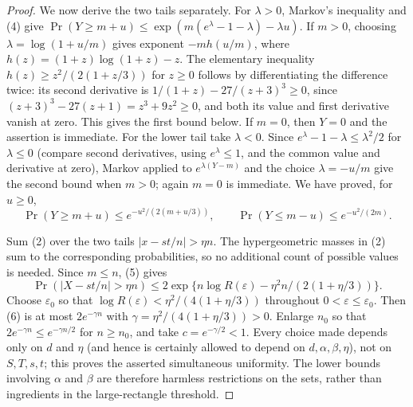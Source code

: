 \begin{proof}
We now derive the two tails separately.  For $\lambda>0$, Markov's inequality
and (4) give
$\Pr(Y\ge m+u)\le
\exp(m(e^\lambda-1-\lambda)-\lambda u)$.  If $m>0$, choosing
$\lambda=\log(1+u/m)$ gives exponent $-m h(u/m)$, where
$h(z)=(1+z)\log(1+z)-z$.  The elementary inequality
$h(z)\ge z^2/(2(1+z/3))$ for $z\ge0$ follows by differentiating the
difference twice: its second derivative is
$1/(1+z)-27/(z+3)^3\ge0$, since
$(z+3)^3-27(z+1)=z^3+9z^2\ge0$, and both its value and first derivative
vanish at zero.  This gives the first bound below.  If $m=0$, then $Y=0$ and the assertion
is immediate.  For the lower tail take $\lambda<0$.  Since
$e^\lambda-1-\lambda\le\lambda^2/2$ for $\lambda\le0$ (compare second
derivatives, using $e^\lambda\le1$, and the common value and derivative at
zero), Markov applied to
$e^{\lambda(Y-m)}$ and the choice $\lambda=-u/m$ give the second bound when
$m>0$; again $m=0$ is immediate.  We have proved, for $u\ge0$,
\[
 \Pr(Y\ge m+u)\le e^{-u^2/(2(m+u/3))},\qquad
 \Pr(Y\le m-u)\le e^{-u^2/(2m)}.                                 \tag{5}
\]

Sum (2) over the two tails $|x-st/n|>\eta n$.  The hypergeometric masses in
(2) sum to the corresponding probabilities, so no additional count of
possible values is needed.  Since $m\le n$, (5) gives
\[
 \Pr(|X-st/n|>\eta n)
 \le 2\exp\{n\log R(\varepsilon)-\eta^2n/(2(1+\eta/3))\}.         \tag{6}
\]
Choose $\varepsilon_0$ so that
$\log R(\varepsilon)<\eta^2/(4(1+\eta/3))$ throughout
$0<\varepsilon\le\varepsilon_0$.  Then (6) is at most
$2e^{-\gamma n}$ with $\gamma=\eta^2/(4(1+\eta/3))>0$.
Enlarge $n_0$ so that $2e^{-\gamma n}\le e^{-\gamma n/2}$ for
$n\ge n_0$, and take $c=e^{-\gamma/2}<1$.  Every choice made depends only on
$d$ and $\eta$ (and hence is certainly allowed to depend on
$d,\alpha,\beta,\eta$), not on $S,T,s,t$; this proves the asserted
simultaneous uniformity.  The lower bounds involving $\alpha$ and $\beta$ are
therefore harmless restrictions on the sets, rather than ingredients in the
large-rectangle threshold.
\end{proof}
